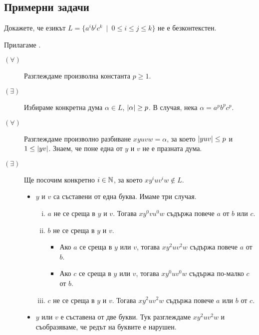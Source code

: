 \subsection{Примерни задачи}

\begin{extra}
\begin{problem}
  Докажете, че езикът $L = \{a^ib^jc^k\ \mid\ 0 \leq i \leq j \leq k\}$ не е безконтекстен.
\end{problem}
\begin{hint}
  Прилагаме .
  \begin{description}
  \item[$(\forall)$]
     Разглеждаме произволна константа $p \geq 1$.
   \item[$(\exists)$]
     Избираме конкретна дума $\alpha \in L$, $\vert{\alpha}\vert \geq p$.
     В случая, нека $\alpha = a^pb^pc^p$.
   \item[$(\forall)$]
     Разглеждаме произволно разбиване $xyuvw = \alpha$, за което $\vert{yuv}\vert \leq p$ и $1 \leq \vert{yv}\vert$.
     Знаем, че поне една от $y$ и $v$ не е празната дума.
   \item[$(\exists)$] Ще посочим конкретно $i \in \mathbb{N}$, за което $xy^iuv^iw \not\in L$.
    \begin{itemize}
    \item
      $y$ и $v$ са съставени от една буква.
      Имаме три случая.
      \begin{enumerate}[i)]
      \item
        $a$ не се среща в $y$ и $v$.
        Тогава $xy^0vu^0w$ съдържа повече $a$ от $b$ или $c$.
      \item
        $b$ не се среща в $y$ и $v$.
        \begin{itemize}
        \item 
          Ако $a$ се среща в $y$ или $v$, тогава $xy^2uv^2w$ съдържа повече $a$ от $b$.
        \item
          Ако $c$ се среща в $y$ или $v$, тогава $xy^0uv^0w$ съдържа по-малко $c$ от $b$.
        \end{itemize}
      \item
        $c$ не се среща в $y$ и $v$.
        Тогава $xy^2uv^2w$ съдържа повече $a$ или $b$ от $c$.
      \end{enumerate}      
     \item
       $y$ или $v$ е съставена от две букви.
       Тук разглеждаме $xy^2uv^2w$ и съобразяваме, че редът на буквите е нарушен.
     \end{itemize}    
   \end{description}
\end{hint}


\end{extra}
